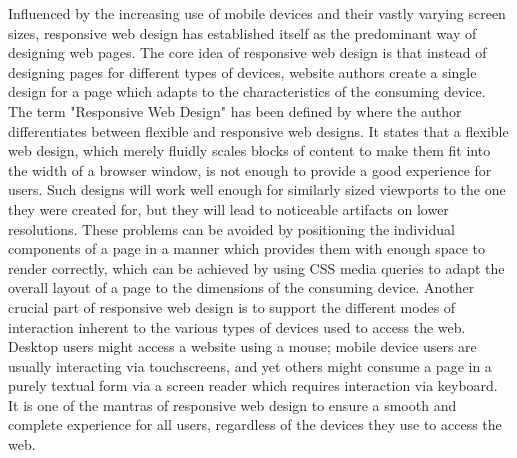 Influenced by the increasing use of mobile devices and their vastly varying screen sizes, responsive web design has established itself as the predominant way of designing web pages. 
The core idea of responsive web design is that instead of designing pages for different types of devices, website authors create a single design for a page which adapts to the characteristics of the consuming device. 
The term "Responsive Web Design" has been defined by \cite{ResponsiveWebDesign} where the author differentiates between flexible and responsive web designs. 
It states that a flexible web design, which merely fluidly scales blocks of content to make them fit into the width of a browser window, is not enough to provide a good experience for users. 
Such designs will work well enough for similarly sized viewports to the one they were created for, but they will lead to noticeable artifacts on lower resolutions. 
These problems can be avoided by positioning the individual components of a page in a manner which provides them with enough space to render correctly, which can be achieved by using CSS media queries to adapt the overall layout of a page to the dimensions of the consuming device. 
Another crucial part of responsive web design is to support the different modes of interaction inherent to the various types of devices used to access the web. 
Desktop users might access a website using a mouse; mobile device users are usually interacting via touchscreens, and yet others might consume a page in a purely textual form via a screen reader which requires interaction via keyboard. 
It is one of the mantras of responsive web design to ensure a smooth and complete experience for all users, regardless of the devices they use to access the web. 
